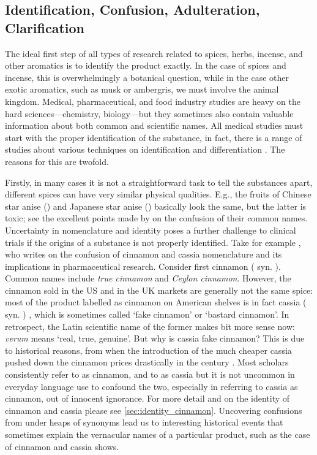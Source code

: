 \subsection{Identification, Confusion, Adulteration, Clarification}

The ideal first step of all types of research related to spices, herbs, incense, and other aromatics is to identify the product exactly. In the case of spices and incense, this is overwhelmingly a botanical question, while in the case other exotic aromatics, such as musk or ambergris, we must involve the animal kingdom. Medical, pharmaceutical, and food industry studies are heavy on the hard sciences---chemistry, biology---but they sometimes also contain valuable information about both common and scientific names. All medical studies must start with the proper identification of the substance, in fact, there is a range of studies about various techniques on identification and differentiation \autocite[cf.][]{ford_cinnamon_2019}. The reasons for this are twofold. 

Firstly, in many cases it is not a straightforward task to tell the substances apart, different spices can have very similar physical qualities. E.g., the fruits of Chinese star anise () and Japanese star anise () basically look the same, but the latter is toxic; see the excellent points made by \textcite{small_confusion_1996} on the confusion of their common names. Uncertainty in nomenclature and identity poses a further challenge to clinical trials if the origins of a substance is not properly identified. Take for example \textcite{oketch-rabah_cinnamon_2018}, who writes on the confusion of cinnamon and cassia nomenclature and its implications in pharmaceutical research. Consider first cinnamon ( syn. ). Common names include \textit{true cinnamon} and \textit{Ceylon cinnamon}. However, the cinnamon sold in the US and in the UK markets are generally not the same spice: most of the product labelled as cinnamon on American shelves is in fact cassia ( syn. ) \autocite{oketch-rabah_cinnamon_2018}, which is sometimes called `fake cinnamon' or `bastard cinnamon'. In retrospect, the Latin scientific name of the former makes bit more sense now: \textit{verum} means `real, true, genuine'. But why is cassia fake cinnamon? This is due to historical reasons, from when the introduction of the much cheaper cassia pushed down the cinnamon prices drastically in the  century \autocite{wijesekera_chemistry_1978}. Most scholars consistently refer to  as cinnamon, and to  as cassia but it is not uncommon in everyday language use to confound the two, especially in referring to cassia as cinnamon, out of innocent ignorance. For more detail and on the identity of cinnamon and cassia please see \cref{sec:identity_cinnamon}. Uncovering confusions from under heaps of synonyms lead us to interesting historical events that sometimes explain the vernacular names of a particular product, such as the case of cinnamon and cassia shows. 


